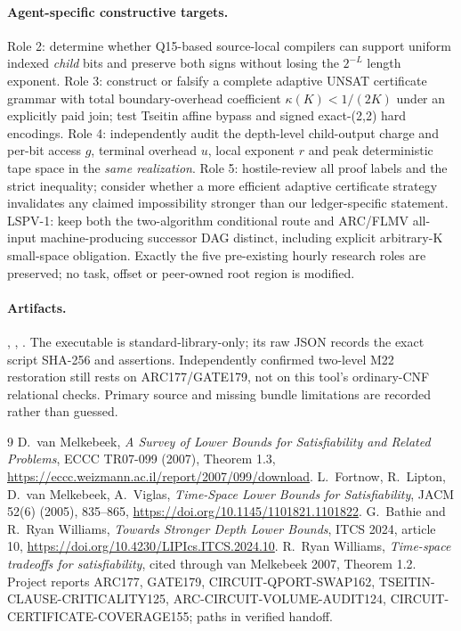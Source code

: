\documentclass[11pt]{article}
\begin{document}
\paragraph{Agent-specific constructive targets.}
Role 2: determine whether Q15-based source-local compilers can support
uniform indexed \emph{child} bits and preserve both signs without losing
the $2^{-L}$ length exponent. Role 3: construct or falsify a complete
adaptive UNSAT certificate grammar with total boundary-overhead
coefficient $\kappa(K)<1/(2K)$ under an explicitly paid join; test
Tseitin affine bypass and signed exact-(2,2) hard encodings.
Role 4: independently audit the depth-level child-output charge and
per-bit access $g$, terminal overhead $u$, local exponent $r$ and
peak deterministic tape space in the \emph{same realization}.
Role 5: hostile-review all proof labels and the strict inequality;
consider whether a more efficient adaptive certificate strategy invalidates
any claimed impossibility stronger than our ledger-specific statement.
LSPV-1: keep both the two-algorithm conditional route and ARC/FLMV
all-input machine-producing successor DAG distinct, including explicit
arbitrary-K small-space obligation. Exactly the five pre-existing
hourly research roles are preserved; no task, offset or peer-owned
root region is modified.

\paragraph{Artifacts.}
,
,
.
The executable is standard-library-only; its raw JSON records the exact
script SHA-256 and assertions. Independently confirmed two-level
M22 restoration still rests on ARC177/GATE179, not on this tool's
ordinary-CNF relational checks. Primary source and missing bundle
limitations are recorded rather than guessed.

\begin{thebibliography}{9}
 D.~van Melkebeek, \emph{A Survey of Lower Bounds for
Satisfiability and Related Problems}, ECCC TR07-099 (2007), Theorem 1.3,
\url{https://eccc.weizmann.ac.il/report/2007/099/download}.
 L.~Fortnow, R.~Lipton, D.~van Melkebeek,
A.~Viglas, \emph{Time-Space Lower Bounds for Satisfiability}, JACM 52(6)
(2005), 835--865, \url{https://doi.org/10.1145/1101821.1101822}.
 G.~Bathie and R.~Ryan Williams, \emph{Towards Stronger
Depth Lower Bounds}, ITCS 2024, article 10,
\url{https://doi.org/10.4230/LIPIcs.ITCS.2024.10}.
 R.~Ryan Williams, \emph{Time-space tradeoffs for
satisfiability}, cited through van Melkebeek 2007, Theorem 1.2.
 Project reports ARC177, GATE179, CIRCUIT-QPORT-SWAP162,
TSEITIN-CLAUSE-CRITICALITY125, ARC-CIRCUIT-VOLUME-AUDIT124,
CIRCUIT-CERTIFICATE-COVERAGE155; paths in verified handoff.
\end{thebibliography}
\end{document}
